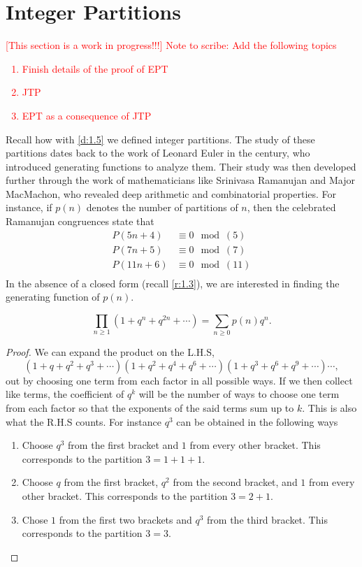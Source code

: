 \section{Integer Partitions}
\textcolor{red}{
[This section is a work in progress!!!] Note to scribe: Add the following topics
\begin{enumerate}
    \item Finish details of the proof of EPT
    \item JTP
    \item EPT as a consequence of JTP
\end{enumerate}
}
Recall how with \cref{d:1.5} we defined integer partitions. The study of these partitions dates back to the work of Leonard Euler in the  century, who introduced generating functions to analyze them. Their study was then developed further through the work of mathematicians like Srinivasa Ramanujan and Major MacMachon, who revealed deep arithmetic and combinatorial properties. For instance, if $p(n)$ denotes the number of partitions of $n$, then the celebrated Ramanujan congruences state that
\begin{align*}
P(5n+4)&\equiv 0\mod{(5)} \\
P(7n+5)&\equiv 0\mod{(7)} \\
P(11n+6)&\equiv 0\mod{(11)} \\ 
\end{align*}
In the absence of a closed form (recall \cref{r:1.3}), we are interested in finding the generating function of $p(n)$.
\begin{claim}\[
\prod_{n\geq 1}(1+q^n+q^{2n}+\cdots) = \sum_{n\geq 0}p(n)q^n.
\]
\label{c:2.1P}
\end{claim}
\begin{proof}
We can expand the product on the L.H.S, \[(1+q+q^2+q^3+\cdots)(1+q^2+q^4+q^6+\cdots)(1+q^3+q^6+q^9+\cdots)\cdots,\] out by choosing one term from each factor in all possible ways. If we then collect like terms, the coefficient of $q^k$ will be the number of ways to choose one term from each factor so that the exponents of the said terms sum up to $k$. This is also what the R.H.S counts. For instance $q^3$ can be obtained in the following ways
\begin{enumerate}
    \item Choose $q^3$ from the first bracket and $1$ from every other bracket. This corresponds to the partition $3=1+1+1$.
    \item Choose $q$ from the first bracket, $q^2$ from the second bracket, and $1$ from every other bracket. This corresponds to the partition $3=2+1$. 
    \item Chose $1$ from the first two brackets and $q^3$ from the third bracket. This corresponds to the partition $3=3$. 
\end{enumerate}
\end{proof}
